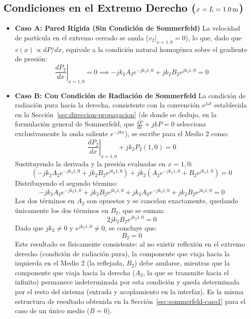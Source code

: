 \documentclass[11pt,letterpaper]{article}
\begin{document}
\subsection{Condiciones en el Extremo Derecho ($x = L = \text{\qty{1,0}{\metre}}$)}\label{sec:caso2-extremo-derecho}

\begin{itemize}
    \item \textbf{Caso A: Pared Rígida (Sin Condición de Sommerfeld)}
    La velocidad de partícula en el extremo cerrado se anula ($\left.v_2\right|_{x=1{,}0} = 0$), lo que, dado que $v(x) \propto dP/dx$, equivale a la condición natural homogénea sobre el gradiente de presión:
    \begin{equation}
        \left. \frac{dP_2}{dx} \right|_{x=1{,}0} = 0 \implies -j k_2 A_2 e^{-j k_2 1{,}0} + j k_2 B_2 e^{j k_2 1{,}0} = 0
    \end{equation}

    \item \textbf{Caso B: Con Condición de Radiación de Sommerfeld}
    La condición de radiación pura hacia la derecha, consistente con la convención $e^{j\omega t}$ establecida en la Sección~\ref{sec:direccion-propagacion} (de donde se dedujo, en la formulación general de Sommerfeld, que $\frac{dP}{dx} + jkP = 0$ selecciona exclusivamente la onda saliente $e^{-jkx}$), se escribe para el Medio 2 como:
    \begin{equation}
        \left. \frac{dP_2}{dx} \right|_{x=1{,}0} + j k_2 P_2(1{,}0) = 0
    \end{equation}
    Sustituyendo la derivada y la presión evaluadas en $x = 1{,}0$:
    \begin{equation}
        \left( -j k_2 A_2 e^{-j k_2 1{,}0} + j k_2 B_2 e^{j k_2 1{,}0} \right) + j k_2 \left( A_2 e^{-j k_2 1{,}0} + B_2 e^{j k_2 1{,}0} \right) = 0
    \end{equation}
    Distribuyendo el segundo término:
    \begin{equation}
        -j k_2 A_2 e^{-j k_2 1{,}0} + j k_2 B_2 e^{j k_2 1{,}0} + j k_2 A_2 e^{-j k_2 1{,}0} + j k_2 B_2 e^{j k_2 1{,}0} = 0
    \end{equation}
    Los dos términos en $A_2$ son opuestos y se cancelan exactamente, quedando únicamente los dos términos en $B_2$, que se suman:
    \begin{equation}
        2 j k_2 B_2 e^{j k_2 1{,}0} = 0
    \end{equation}
    Dado que $jk_2 \neq 0$ y $e^{jk_2 1{,}0} \neq 0$, se concluye que:
    \begin{equation}
        B_2 = 0
    \end{equation}
    Este resultado es físicamente consistente: al no existir reflexión en el extremo derecho (condición de radiación pura), la componente que viaja hacia la izquierda en el Medio 2 (la reflejada, $B_2$) debe anularse, mientras que la componente que viaja hacia la derecha ($A_2$, la que se transmite hacia el infinito) permanece indeterminada por esta condición y queda determinada por el resto del sistema (entrada y acoplamiento en la interfaz). Es la misma estructura de resultado obtenida en la Sección~\ref{sec:sommerfeld-caso1} para el caso de un único medio ($B=0$).
\end{itemize}
\end{document}
